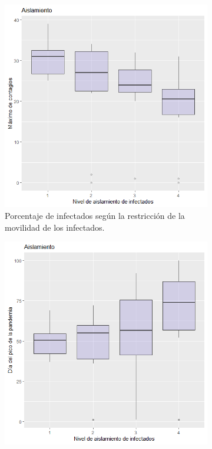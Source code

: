 \documentclass{article}
\begin{document}
\begin{figure}
     \begin{subfigure}[]{.4\linewidth}
         \includegraphics[width=\linewidth]{p6_infectados.png}
         \caption{Porcentaje de infectados según la restricción de la movilidad de los infectados.}
         \label{fig2a}
     \end{subfigure}
     \begin{subfigure}[]{.4\linewidth}
         \includegraphics[width=\linewidth]{p6_dia.png}

\end{subfigure}
\end{figure}
\end{document}
